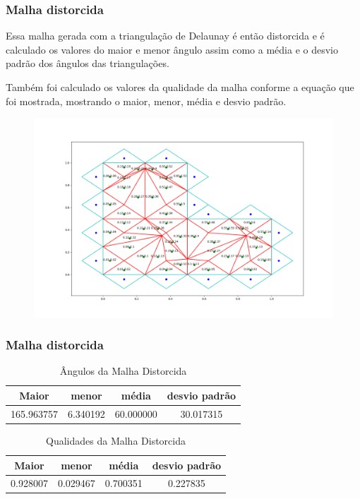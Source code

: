 \documentclass[brazil]{beamer}
\begin{document}
\begin{frame}
  \frametitle{Malha distorcida}

  Essa malha gerada com a triangulação de Delaunay é então distorcida e é calculado os valores do maior e menor ângulo assim como a média e o desvio padrão dos ângulos das triangulações.

  Também foi calculado os valores da qualidade da malha conforme a equação que foi mostrada, mostrando o maior, menor, média e desvio padrão.

  \begin{figure}
    \includegraphics[width=0.6\linewidth]{malha-ruim.png}
  \end{figure}

\end{frame}

\begin{frame}
  \frametitle{Malha distorcida}

  \begin{table}[hb]
    \centering
    \par\caption{Ângulos da Malha Distorcida}
    \begin{tabular}{c|c|c|c}
      Maior      & menor    & média     & desvio padrão \\\hline\hline
      165.963757 & 6.340192 & 60.000000 & 30.017315     \\\hline
    \end{tabular}
    \label{tab:angulos-malha-distorcida}
  \end{table}

  \begin{table}[hb]
    \centering
    \par\caption{Qualidades da Malha Distorcida}
    \begin{tabular}{c|c|c|c}
      Maior    & menor    & média    & desvio padrão \\\hline\hline
      0.928007 & 0.029467 & 0.700351 & 0.227835      \\\hline
    \end{tabular}
    \label{tab:qualidades-malha-distorcida}
  \end{table}

\end{frame}
\end{document}
